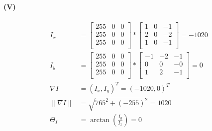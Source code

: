 \documentclass[a4paper]{article}
\begin{document}
\paragraph{(V)}
\begin{align*}
    I_x &= \begin{bmatrix}
        255 & 0 & 0\\
        255 & 0 & 0\\
        255 & 0 & 0\\
        \end{bmatrix}
         * 
         \begin{bmatrix}
        1 & 0 & -1\\
        2 & 0 & -2\\
        1 & 0 & -1\\
        \end{bmatrix}
        = -1020\\
        I_y &= \begin{bmatrix}
        255 & 0 & 0\\
        255 & 0 & 0\\
        255 & 0 & 0\\
        \end{bmatrix}
         * 
         \begin{bmatrix}
        -1 & -2 & -1\\
        0 & 0 & -0\\
        1 & 2 & -1\\
        \end{bmatrix}
        = 0\\
        \nabla I &= (I_x,I_y)^T = (-1020,0)^T\\
        \| \nabla I\| &= \sqrt{765^2+(-255)^2} = 1020\\
        \Theta_I &= \operatorname{arctan}(\frac{I_y}{I_x}) = 0\\
\end{align*}
\end{document}
